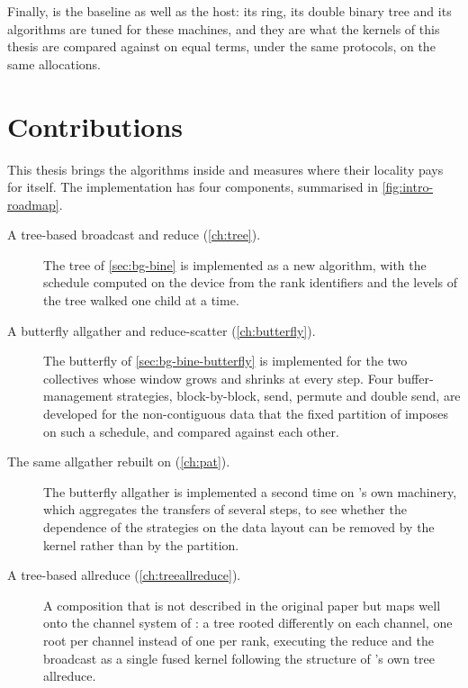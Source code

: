 Finally, \nccl{} is the baseline as well as the host: its ring, its double binary tree and its \pat{} algorithms are tuned for these machines, and they are what the \bine{} kernels of this thesis are compared against on equal terms, under the same protocols, on the same allocations.

\section{Contributions}\label{sec:intro-contributions}

This thesis brings the \bine{} algorithms inside \nccl{} and measures where their locality pays for itself.
The implementation has four components, summarised in \cref{fig:intro-roadmap}.

\begin{description}
  \item[A tree-based broadcast and reduce (\cref{ch:tree}).]
    The \bine{} tree of \cref{sec:bg-bine} is implemented as a new \nccl{} algorithm, with the schedule computed on the device from the rank identifiers and the levels of the tree walked one child at a time.
  \item[A butterfly allgather and reduce-scatter (\cref{ch:butterfly}).]
    The \bine{} butterfly of \cref{sec:bg-bine-butterfly} is implemented for the two collectives whose window grows and shrinks at every step.
    Four buffer-management strategies, block-by-block, send, permute and double send, are developed for the non-contiguous data that the fixed partition of \nccl{} imposes on such a schedule, and compared against each other.
  \item[The same allgather rebuilt on \pat{} (\cref{ch:pat}).]
    The butterfly allgather is implemented a second time on \nccl{}'s own \pat{} machinery, which aggregates the transfers of several steps, to see whether the dependence of the strategies on the data layout can be removed by the kernel rather than by the partition.
  \item[A tree-based allreduce (\cref{ch:treeallreduce}).]
    A composition that is not described in the original \bine{} paper but maps well onto the channel system of \nccl{}: a \bine{} tree rooted differently on each channel, one root per channel instead of one per rank, executing the reduce and the broadcast as a single fused kernel following the structure of \nccl{}'s own tree allreduce.
\end{description}


